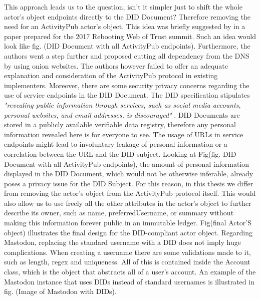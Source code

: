 This approach leads us to the question, isn't it simpler just to shift the whole actor's object endpoints directly to the DID Document? Therefore removing the need for an ActivityPub actor's object. This idea was briefly suggested by \cite{webber_sporny_2017} in a paper prepared for the 2017 Rebooting Web of Trust summit. Such an idea would look like fig. (DID Document with all ActivityPub endpoints). Furthermore, the authors went a step further and proposed cutting all dependency from the DNS by using onion websites. The authors however failed to offer an adequate explanation and consideration of the ActivityPub protocol in existing implementers. Moreover, there are some security privacy concerns regarding the use of service endpoints in the DID Document. The DID specification stipulates \emph{"revealing public information through services, such as social media accounts, personal websites, and email addresses, is discouraged"} \cite{sporny_longley_sabadello_reed_steele_2021}. DID Documents are stored in a publicly available verifiable data registry, therefore any personal information revealed here is for everyone to see. The usage of URLs in service endpoints might lead to involuntary leakage of personal information or a correlation between the URL and the DID subject. Looking at Fig(fig. DID Document with all ActivityPub endpoints), the amount of personal information displayed in the DID Document, which would not be otherwise inferable, already poses a privacy issue for the DID Subject. For this reason, in this thesis we differ from removing the actor's object from the ActivityPub protocol itself. This would also allow us to use freely all the other attributes in the actor's object to further describe its owner, such as name, preferredUsername, or summary without making this information forever public in an immutable ledger. Fig(final Actor'S object) illustrates the final design for the DID-compliant actor object. 
Regarding Mastodon, replacing the standard username with a DID does not imply huge complications. When creating a username there are some validations made to it, such as length, regex and uniqueness. All of this is contained inside the Account class, which is the object that abstracts all of a user's account. An example of the Mastodon instance that uses DIDs instead of standard usernames is illustrated in fig. (Image of Mastodon with DIDs). 


